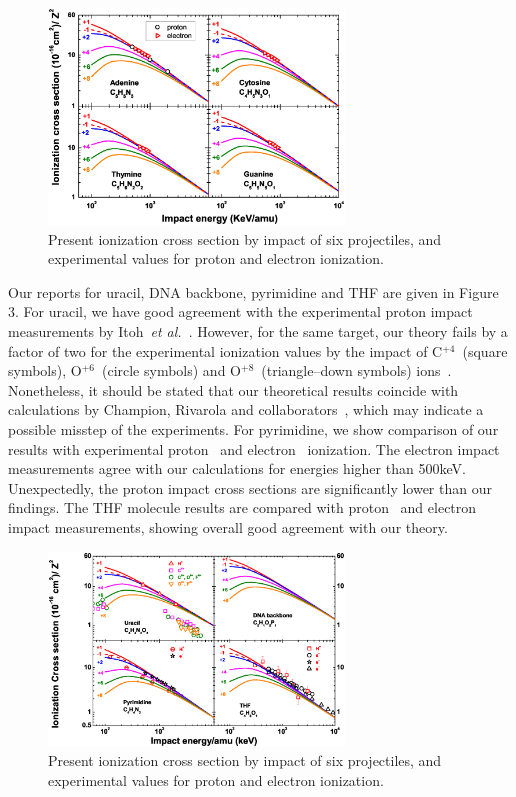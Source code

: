 \documentclass[preprint,12pt]{article}
\begin{document}
\begin{figure}[H]
\centering
\includegraphics[width=0.7\textwidth]{figuras/Fig_finales/Fig2.eps}
\caption{Present ionization cross section by impact of six projectiles, 
and experimental values for proton and electron ionization.}
\label{eq:crossDNA}
\end{figure} 

Our reports for uracil, DNA backbone, pyrimidine and THF are given in 
Figure 3. For uracil, we have good agreement with the experimental 
proton impact measurements by Itoh~{\it et al.}~\cite{itoh2013}. 
However, for the same target, our theory fails by a factor of two for 
the experimental ionization values by the impact of C$^{+4}$~(square symbols), 
O$^{+6}$~(circle symbols) and O$^{+8}$~(triangle--down symbols) 
ions~\cite{agnihotri2012,agnihotri2013}. 
Nonetheless, it should be stated that our theoretical results coincide 
with calculations by Champion, Rivarola and 
collaborators~\cite{champion2012,agnihotri2012}, which may indicate a 
possible misstep of the experiments. 
For pyrimidine, we show comparison of our results with experimental 
proton~\cite{wolff2014} and electron~\cite{bug2017} ionization. 
The electron impact measurements agree with our calculations for energies
higher than 500keV. Unexpectedly, the proton impact cross sections are
significantly lower than our findings. 
The THF molecule results are compared with proton~\cite{wang2016} and 
electron~\cite{wolf2019,bug2017,fuss2009} impact measurements, showing
overall good agreement with our theory. 


\begin{figure}[H]
\centering
\includegraphics[width=0.7\textwidth]{figuras/Fig_finales/Fig3.eps}
\caption{Present ionization cross section by impact of six projectiles, 
and experimental values for proton and electron ionization.}
\label{eq:crossDNA}
\end{figure} 
\end{document}
